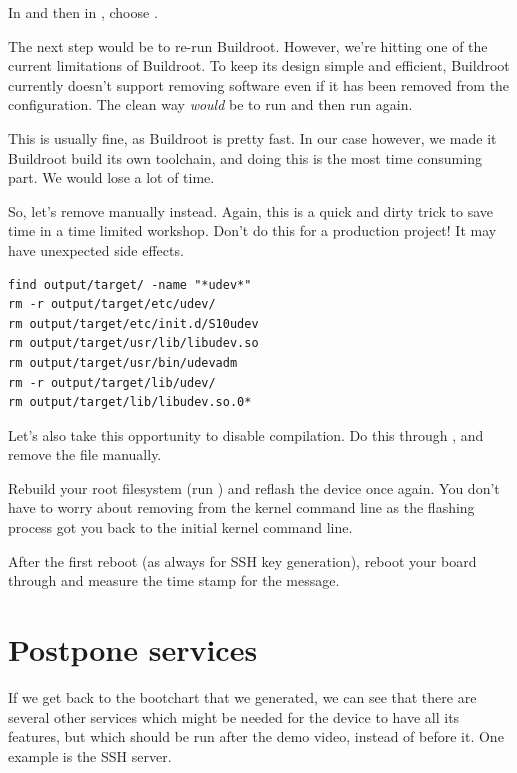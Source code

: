 In  and then in ,
choose .

The next step would be to re-run Buildroot. However, we're hitting one
of the current limitations of Buildroot. To keep its design simple and
efficient, Buildroot currently doesn't support removing software
even if it has been removed from the configuration. The clean way
{\em would} be to run  and then run 
again.

This is usually fine, as Buildroot is pretty fast. In our case however,
we made it Buildroot build its own toolchain, and doing this is the most
time consuming part. We would lose a lot of time.

So, let's remove  manually instead. Again, this is a quick
and dirty trick to save time in a time limited workshop. Don't do this
for a production project! It may have unexpected side effects.

\begin{verbatim}
find output/target/ -name "*udev*"
rm -r output/target/etc/udev/
rm output/target/etc/init.d/S10udev
rm output/target/usr/lib/libudev.so
rm output/target/usr/bin/udevadm
rm -r output/target/lib/udev/
rm output/target/lib/libudev.so.0*
\end{verbatim}

Let's also take this opportunity to disable 
compilation. Do this through , and remove
the  file manually.

Rebuild your root filesystem (run ) and reflash the device once again.
You don't have to worry about removing  from the kernel
command line as the flashing process got you back to the initial kernel
command line.

After the first reboot (as always for SSH key generation), reboot your
board through  and measure the time stamp for the
 message.

\section{Postpone services}

If we get back to the bootchart that we generated, we can see that there
are several other services which might be needed for the device to
have all its features, but which should be run after the demo video,
instead of before it. One example is the SSH server.

